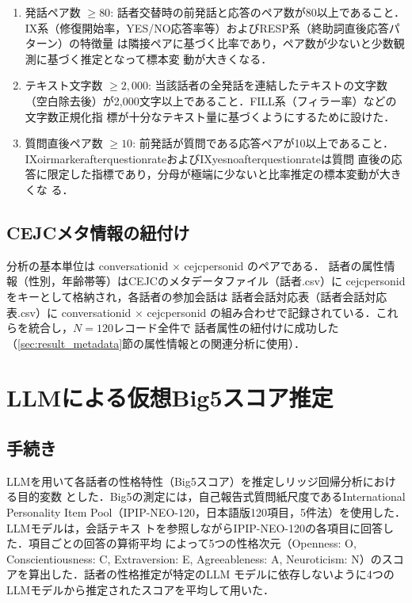 \documentclass[dvipdfmx,11pt,a4paper]{bxjsarticle}
\renewcommand{\_}{\paperorigunderscore\allowbreak}%
\begin{document}
\begin{enumerate}
  \item 発話ペア数 $\geq 80$: 話者交替時の前発話と応答のペア数が80以上であること．
IX系（修復開始率，YES/NO応答率等）およびRESP系（終助詞直後応答パターン）の特徴量
は隣接ペアに基づく比率であり，ペア数が少ないと少数観測に基づく推定となって標本変
動が大きくなる．
  \item テキスト文字数 $\geq 2{,}000$: 当該話者の全発話を連結したテキストの文字数
（空白除去後）が2,000文字以上であること．FILL系（フィラー率）などの文字数正規化指
標が十分なテキスト量に基づくようにするために設けた．
  \item 質問直後ペア数 $\geq 10$: 前発話が質問である応答ペアが10以上であること．
IX\_oirmarker\_after\_question\_rateおよびIX\_yesno\_after\_question\_rateは質問
直後の応答に限定した指標であり，分母が極端に少ないと比率推定の標本変動が大きくな
る．
\end{enumerate}


\subsection{CEJCメタ情報の紐付け}
分析の基本単位は conversation\_id $\times$ cejc\_person\_id のペアである．
話者の属性情報（性別，年齢帯等）はCEJCのメタデータファイル（話者.csv）に
cejc\_person\_idをキーとして格納され，各話者の参加会話は
話者会話対応表（話者会話対応表.csv）に conversation\_id $\times$ cejc\_person\_id
の組み合わせで記録されている．これらを統合し，$N = 120$レコード全件で
話者属性の紐付けに成功した（\ref{sec:result_metadata}節の属性情報との関連分析に使用）．

\section{LLMによる仮想Big5スコア推定}
\label{sec:big5score}

\subsection{手続き}

LLMを用いて各話者の性格特性（Big5スコア）を推定しリッジ回帰分析における目的変数
とした．Big5の測定には，自己報告式質問紙尺度であるInternational Personality Item
Pool（IPIP-NEO-120，日本語版120項目，5件法）を使用した．LLMモデルは，会話テキス
トを参照しながらIPIP-NEO-120の各項目に回答した．項目ごとの回答の算術平均
によって5つの性格次元（Openness: O, Conscientiousness: C, Extraversion: E,
Agreeableness: A, Neuroticism: N）のスコアを算出した．話者の性格推定が特定のLLM
モデルに依存しないように4つのLLMモデルから推定されたスコアを平均して用いた．
\end{document}
